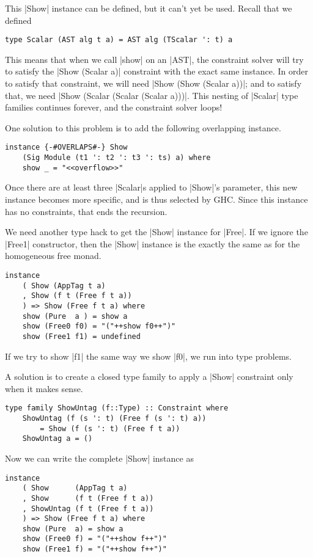 \documentclass[preprint]{sigplanconf}
\theoremstyle{definition}
\begin{document}
This |Show| instance can be defined, but it can't yet be used.
Recall that we defined
\begin{lstlisting}
type Scalar (AST alg t a) = AST alg (TScalar ': t) a
\end{lstlisting}
This means that when we call |show| on an |AST|,
the constraint solver will try to satisfy the |Show (Scalar a)| constraint with the exact same instance.
In order to satisfy that constraint, we will need |Show (Show (Scalar a))|;
and to satisfy that, we need |Show (Scalar (Scalar (Scalar a)))|.
This nesting of |Scalar| type families continues forever,
and the constraint solver loops!

One solution to this problem is to add the following overlapping instance.
\begin{lstlisting}
instance {-#OVERLAPS#-} Show
    (Sig Module (t1 ': t2 ': t3 ': ts) a) where
    show _ = "<<overflow>>"
\end{lstlisting}
Once there are at least three |Scalar|s applied to |Show|'s parameter,
this new instance becomes more specific,
and is thus selected by GHC.
Since this instance has no constraints,
that ends the recursion.

We need another type hack to get the |Show| instance for |Free|.
If we ignore the |Free1| constructor, then the |Show| instance is the exactly the same as for the homogeneous free monad.
\begin{lstlisting}
instance
    ( Show (AppTag t a)
    , Show (f t (Free f t a))
    ) => Show (Free f t a) where
    show (Pure  a ) = show a
    show (Free0 f0) = "("++show f0++")"
    show (Free1 f1) = undefined
\end{lstlisting}
If we try to show |f1| the same way we show |f0|,
we run into type problems.

A solution is to create a closed type family to apply a |Show| constraint only when it makes sense.
\begin{lstlisting}
type family ShowUntag (f::Type) :: Constraint where
    ShowUntag (f (s ': t) (Free f (s ': t) a))
        = Show (f (s ': t) (Free f t a))
    ShowUntag a = ()
\end{lstlisting}
Now we can write the complete |Show| instance as
\begin{lstlisting}
instance
    ( Show      (AppTag t a)
    , Show      (f t (Free f t a))
    , ShowUntag (f t (Free f t a))
    ) => Show (Free f t a) where
    show (Pure  a) = show a
    show (Free0 f) = "("++show f++")"
    show (Free1 f) = "("++show f++")"
\end{lstlisting}
\end{document}
